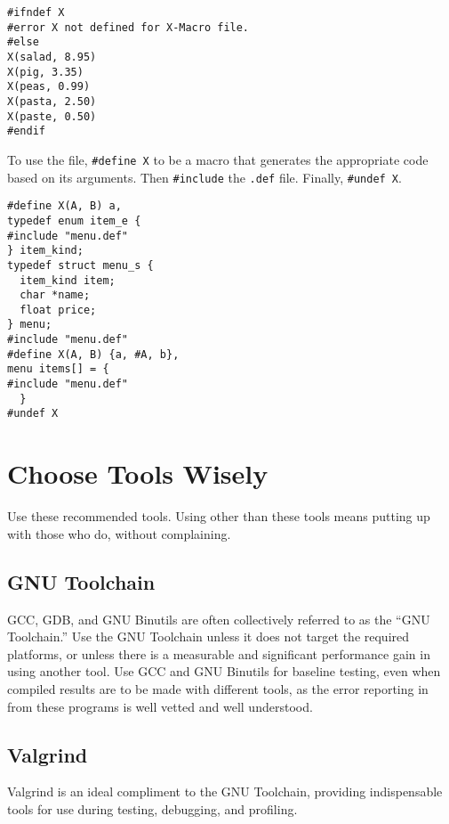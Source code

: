 \documentclass{lulu}
\newcommand{\code}[1]{\texttt{#1}\xspace}
\newcommand{\heading}[1]{\markboth{\textup{\thechapter\ -- #1}}{}}
\begin{document}
\begin{verbatim}
#ifndef X
#error X not defined for X-Macro file.
#else
X(salad, 8.95)
X(pig, 3.35)
X(peas, 0.99)
X(pasta, 2.50)
X(paste, 0.50)
#endif
\end{verbatim}

To use the file, \code{\#define X} to be a macro that generates the
appropriate code based on its arguments.  Then \code{\#include} the
\code{.def} file.  Finally, \code{\#undef X}.

\begin{verbatim}
#define X(A, B) a,
typedef enum item_e {
#include "menu.def"
} item_kind;
typedef struct menu_s {
  item_kind item;
  char *name;
  float price;
} menu;
#include "menu.def"
#define X(A, B) {a, #A, b},
menu items[] = {
#include "menu.def"
  }
#undef X
\end{verbatim}

\chapter{Choose Tools Wisely}
\heading{Choose Tools Wisely}

Use these recommended tools.  Using other than these tools means
putting up with those who do, without complaining.

\section{GNU Toolchain}

GCC, GDB, and GNU Binutils are often collectively referred to as the
``GNU Toolchain.''  Use the GNU Toolchain unless it does not target
the required platforms, or unless there is a measurable and
significant performance gain in using another tool.  Use GCC and GNU
Binutils for baseline testing, even when compiled results are to be
made with different tools, as the error reporting in from these
programs is well vetted and well understood.

\section{Valgrind}

Valgrind is an ideal compliment to the GNU Toolchain, providing
indispensable tools for use during testing, debugging, and profiling.
\end{document}
